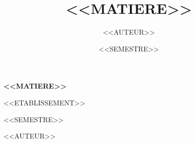 \documentclass[french,11pt,oneside]{scrbook}
\title{<<MATIERE>>}
\author{<<AUTEUR>>}
\date{<<SEMESTRE>>}
\begin{document}
\begin{titlepage}
  \centering
  \vspace*{2cm}
  {\sffamily\Huge\bfseries\color{coursnavy} <<MATIERE>> \par}
  \vspace{0.5cm}
  {\sffamily\Large\color{coursgray} <<ETABLISSEMENT>> \par}
  \vspace{2cm}
  {\Large <<SEMESTRE>> \par}
  \vfill
  {\large <<AUTEUR>> \par}
\end{titlepage}

\tableofcontents

% 

\printglossary[title=Glossaire, toctitle=Glossaire]
\end{document}

